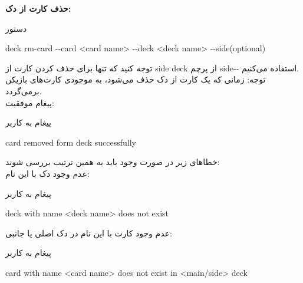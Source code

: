 \documentclass[]{article}
\begin{document}
\vspace{.5cm}
\textbf{حذف کارت از دک:}
\begin{mybox}[colback=yellow]{دستور}
	\begin{latin}	
		deck rm-card -{}-card <card name> -{}-deck <deck name> 
		-{}-side(optional)
	\end{latin}
\end{mybox}
توجه کنید که تنها برای حذف کردن کارت از side deck از پرچم side-{}- استفاده 
می‌کنیم.
\\
توجه: زمانی که یک کارت از دک حذف می‌شود، به موجودی کارت‌های بازیکن برمی‌گردد.
\\
پیغام موفقیت:
\begin{mybox}[colback=yellow]{پیغام به کاربر}
	\begin{latin}	
		card removed form deck successfully
	\end{latin}
\end{mybox}
خطاهای زیر در صورت وجود باید به همین ترتیب بررسی شوند:
\\
عدم وجود دک با این نام:
\begin{mybox}[colback=yellow]{پیغام به کاربر}
	\begin{latin}	
		deck with name <deck name> does not exist
	\end{latin}
\end{mybox}
عدم وجود کارت با این نام در دک اصلی یا جانبی:
\begin{mybox}[colback=yellow]{پیغام به کاربر}
	\begin{latin}	
		card with name <card name> does not exist in <main/side> deck
	\end{latin}
\end{mybox}
\end{document}
